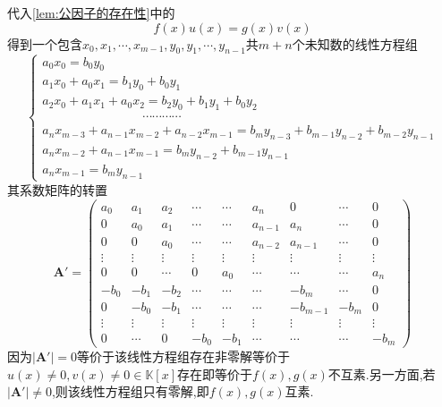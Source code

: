 代入\cref{lem:公因子的存在性}中的\[f\left(x\right)u\left(x\right)=g\left(x\right)v\left(x\right)\]得到一个包含$x_0,x_1,\cdots,x_{m-1},y_0,y_1,\cdots,y_{n-1}$共$m+n$个未知数的线性方程组
\[
\begin{cases*}
a_0x_0=  b_0y_0\\
a_1x_0+a_0x_1=b_1y_0+b_0y_1\\
a_2x_0+a_1x_1+a_0x_2=b_2y_0+b_1y_1+b_0y_2\\
\qquad \qquad   \qquad\qquad\cdots\cdots\cdots\cdots\\
a_nx_{m-3}+a_{n-1}x_{m-2}+a_{n-2}x_{m-1}=
b_m y_{n-3}+b_{m-1}y_{n-2}+b_{m-2}y_{n-1}\\
a_nx_{m-2}+a_{n-1}x_{m-1}=b_m y_{n-2}+b_{m-1}y_{n-1}\\
a_nx_{m-1}=b_m y_{n-1}
\end{cases*}
\]
其系数矩阵的转置
\[
\bm{A}'=\begin{pmatrix}
    a_0&a_1&a_2&\cdots&\cdots&a_n&0&\cdots&0\\
    0&a_0&a_1&\cdots&\cdots&a_{n-1}&a_n&\cdots&0\\
    0&0&a_0&\cdots&\cdots&a_{n-2}&a_{n-1}&\cdots&0\\
    \vdots&\vdots&\vdots&\vdots&\vdots&\vdots&\vdots&\vdots&\vdots\\
    0&0&\cdots&0&a_0&\cdots&\cdots&\cdots&a_n\\
    -b_0&-b_1&-b_2&\cdots&\cdots&\cdots&-b_{m}&\cdots&0\\
    0&-b_0&-b_1&\cdots&\cdots&\cdots&-b_{m-1}&-b_m&0\\
    \vdots&\vdots&\vdots&\vdots&\vdots&\vdots&\vdots&\vdots&\vdots\\
    0&\cdots&0&-b_0&-b_1&\cdots&\cdots&\cdots&-b_m
\end{pmatrix}
\]
因为$\left|\bm{A}'\right|=0$等价于该线性方程组存在非零解等价于
$u\left(x\right)\neq 0,v\left(x\right)\neq 0\in\mathbb{K}\left[x\right]$存在即等价于$f\left(x\right),g\left(x\right)$不互素.另一方面,若$\left|\bm{A}'\right|\neq 0$,则该线性方程组只有零解,即$f\left(x\right),g\left(x\right)$互素.
